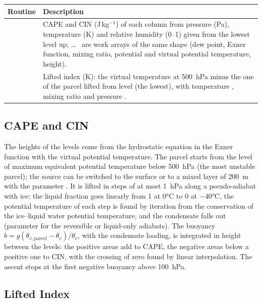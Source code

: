 \begin{longtable}{L{6cm} L{8cm}}
  \toprule
  \textbf{Routine} & \textbf{Description} \\
  \midrule
  \endhead
  \bottomrule
  \endfoot
   &
    CAPE and CIN (J\,kg$^{-1}$) of each column from pressure (Pa),
    temperature (K) and relative humidity (0--1) given from the lowest
    level up;  \ldots\  are work arrays of the same shape
    (dew point, Exner function, mixing ratio, potential and virtual
    potential temperature, height). \\
   &
    Lifted index (K): the virtual temperature at 500~hPa  minus
    the one of the parcel lifted from level  (the lowest), with
    temperature , mixing ratio  and pressure . \\
\end{longtable}

\subsection{CAPE and CIN}

The heights of the levels come from the hydrostatic equation in the Exner
function with the virtual potential temperature. The parcel starts from the
level of maximum equivalent potential temperature below 500~hPa (the most
unstable parcel); the source can be switched to the surface or to a mixed
layer of 200~m with the parameter . It is lifted in steps of
at most 1~hPa along a pseudo-adiabat with ice: the liquid fraction goes
linearly from 1 at 0°C to 0 at $-40$°C, the potential temperature of each
step is found by iteration from the conservation of the ice--liquid water
potential temperature, and the condensate falls out (parameter
 for the reversible or liquid-only adiabats). The buoyancy
$b = g(\theta_{v,\text{parcel}}-\theta_v)/\theta_v$, with the condensate
loading, is integrated in height between the levels: the positive areas add
to CAPE, the negative areas below a positive one to CIN, with the crossing
of zero found by linear interpolation. The ascent stops at the first
negative buoyancy above 100~hPa.

\subsection{Lifted Index}

